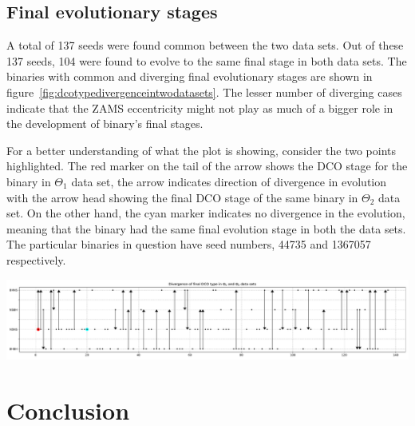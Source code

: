 \documentclass[journal, twocolumns]{IEEEtran}
\begin{document}
    \subsection{Final evolutionary stages}
    \label{subsec:finalevolutionarystages}
    A total of 137 seeds were found common between the two data sets.
    Out of these 137 seeds, 104 were found to evolve to the same final stage in both data sets.
    The binaries with common and diverging final evolutionary stages are shown in figure~\ref{fig:dcotypedivergenceintwodatasets}.
    The lesser number of diverging cases indicate that the ZAMS eccentricity might not play as much of a bigger role in the development of binary's final stages.

    For a better understanding of what the plot is showing, consider the two points highlighted.
    The red marker on the tail of the arrow shows the DCO stage for the binary in $\Theta_1$ data set, the arrow indicates direction of divergence in evolution with the arrow head showing the final DCO stage of the same binary in $\Theta_2$ data set.
    On the other hand, the cyan marker indicates no divergence in the evolution, meaning that the binary had the same final evolution stage in both the data sets.
    The particular binaries in question have seed numbers, 44735 and 1367057 respectively.

    \begin{table}
        \centering
        \includegraphics[width=\textwidth]{analysis_data/004__images_for_latex/dco_type_divergence_in_two_datasets}
        \label{fig:dcotypedivergenceintwodatasets}
    \end{table}


    \section{Conclusion}
    \label{sec:conclusion}
\end{document}
